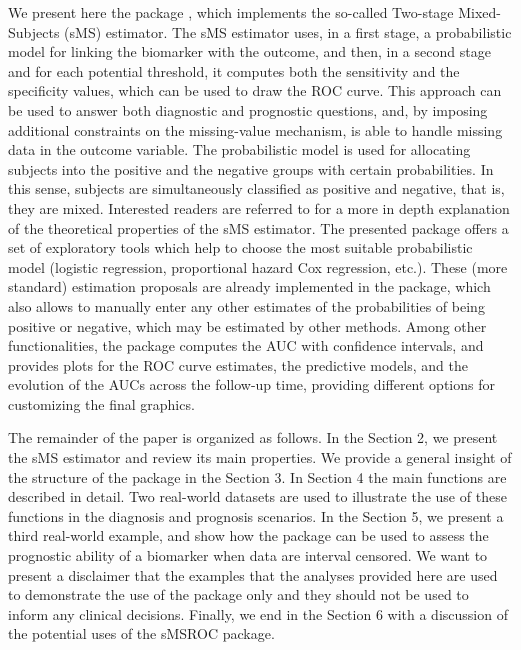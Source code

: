 We present here the package , which implements the so-called Two-stage Mixed-Subjects (sMS) estimator. The sMS estimator uses, in a first stage, a probabilistic model for linking the biomarker with the outcome, and then, in a second stage and for each potential threshold, it computes both the sensitivity and the specificity values, which can be used to draw the ROC curve. This approach can be used to answer both diagnostic and prognostic questions, and, by imposing additional constraints on the missing-value mechanism, is able to handle missing data in the outcome variable. The probabilistic model is used for allocating subjects into the positive and the negative groups with certain probabilities. In this sense, subjects are simultaneously classified as positive and negative, that is, they are mixed. Interested readers are referred to  \citet{Diaz-Coto2021} for a more in depth explanation of the theoretical properties of the sMS estimator. The presented  package offers a set of exploratory tools which help to choose the most suitable probabilistic model (logistic regression, proportional hazard Cox regression, etc.). These (more standard) estimation proposals are already implemented in the package, which also allows to manually enter any other estimates of the probabilities of being positive or negative, which may be estimated by other methods. Among other functionalities, the  package computes the AUC with confidence intervals, and provides plots for the ROC curve estimates, the predictive models, and the evolution of the AUCs across the follow-up time, providing different options for customizing the final graphics.

The remainder of the  paper is organized as follows. In the Section 2, we present the sMS estimator and review its main properties. We provide a general insight of the structure of the   package in the Section 3. In Section 4 the main functions are described in detail. Two real-world datasets are used to illustrate the use of these functions in the diagnosis and prognosis scenarios. In the Section 5, we present a third real-world example, and show how the package can be used to assess the prognostic ability of a biomarker when data are interval censored. We want to present a disclaimer that the examples that the analyses provided here are used to demonstrate the use of the package only and they should not be used to inform any clinical decisions. Finally, we end in the Section 6 with a discussion of the potential uses of the sMSROC package.

